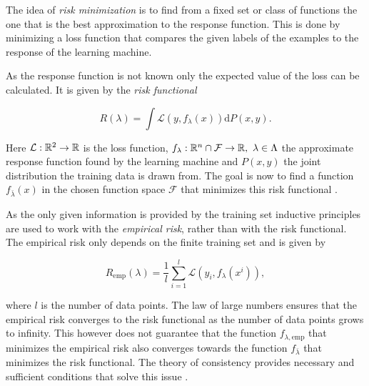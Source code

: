 The idea of \emph{risk minimization} is to find from a fixed set or class of functions the one that is the best approximation to the response function. This is done by minimizing a loss function that compares the given labels of the examples to the response of the learning machine.

As the response function is not known only the expected value of the loss can be calculated. It is given by the \emph{risk functional} 

\begin{equation}
	R(\lambda) = \int{\mathcal{L}(y,f_{\lambda}(x))\text{d}P(x,y)}.
\label{risk_func}
\end{equation}

Here \(\mathcal{L}: \mathbb{R}^2 \to \mathbb{R}\) is the loss function, \(f_{\lambda}: \mathbb{R}^{n}\cap\mathcal{F} \to \mathbb{R}, ~ \lambda \in \Lambda\) the approximate response function found by the learning machine and \(P(x,y)\) the joint distribution the training data is drawn from. The goal is now to find a function \(f_{\bar{\lambda}}(x)\) in the chosen function space \(\mathcal{F}\) that minimizes this risk functional \cite[989]{Vapnik1999}.

As the only given information is provided by the training set inductive principles are used to work with the \emph{empirical risk}, rather than with the risk functional.
The empirical risk only depends on the finite training set  and is given by 


\begin{equation}
	R_{\text{emp}}(\lambda) = \frac{1}{l} \sum_{i = 1}^{l}\mathcal{L}(y_i,f_{\lambda}(x^i)),
\label{emp_risk}
\end{equation}

where \(l\) is the number of data points.
The law of large numbers ensures that the empirical risk converges to the risk functional as the number of data points grows to infinity. This however does not guarantee that the function \(f_{\lambda,\text{emp}}\) that minimizes the empirical risk also converges towards the function \(f_{\bar{\lambda}}\) that minimizes the risk functional.
The theory of consistency provides necessary and sufficient conditions that solve this issue  \cite[p. 989]{Vapnik1999}.

